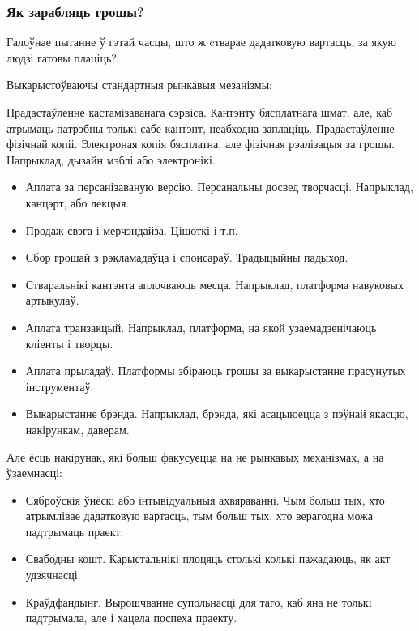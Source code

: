 \documentclass[10pt, a5paper]{article}
\begin{document}
\subsubsection*{Як зарабляць грошы?}

Галоўнае пытанне ў гэтай часцы, што ж cтварае дадатковую вартасць, за якую людзі гатовы плаціць?

Выкарыстоўваючы стандартныя рынкавыя мезанізмы:

Прадастаўленне кастамізаванага сэрвіса. Кантэнту бясплатнага шмат, але, каб атрымаць патрэбны толькі сабе кантэнт, неабходна заплаціць.
Прадастаўленне фізічнай копіі. Электроная копія бясплатна, але фізічная рэалізацыя за грошы. Напрыклад, дызайн мэблі або электронікі.

\begin{itemize}
  \item Аплата за персанізаваную версію. Персанальны досвед творчасці. Напрыклад, канцэрт, або лекцыя.
  \item Продаж свэга і мерчэндайза. Цішоткі і т.п.
  \item Сбор грошай з рэкламадаўца і спонсараў. Традыцыйны падыход.
  \item Стваральнікі кантэнта аплочваюць месца. Напрыклад, платформа навуковых артыкулаў.
  \item Аплата транзакцый. Напрыклад, платформа, на якой узаемадзенічаюць кліенты і творцы.
  \item Аплата прыладаў. Платформы збіраюць грошы за выкарыстанне прасунутых інструментаў.
  \item Выкарыстанне брэнда. Напрыклад, брэнда, які асацыюецца з пэўнай якасцю, накірункам, даверам.
\end{itemize}

Але ёсць накірунак, які больш факусуецца на не рынкавых механізмах, а на ўзаемнасці:

\begin{itemize}
  \item Сяброўскія ўнёскі або інтывідуальныя ахвяраванні. Чым \linebreak больш  тых, хто атрымлівае дадатковую вартасць, тым больш тых, хто верагодна можа падтрымаць праект.
  \item Свабодны кошт. Карыстальнікі плоцяць столькі колькі пажадаюць, як акт удзячнасці.
  \item Краўдфандынг. Вырошчванне супольнасці для таго, каб яна не толькі падтрымала, але і хацела поспеха праекту.
\end{itemize}
\end{document}
